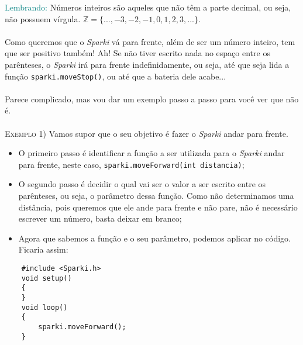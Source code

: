     \begin{center}
    \textcolor{teal}{Lembrando:} Números inteiros são aqueles que não têm a parte decimal, ou seja, não possuem vírgula. $\mathbb{Z}=\{..., -3, -2, -1, 0, 1, 2, 3, ...\}$.
    \end{center}
    
    \paragraph{}
    Como queremos que o \textsl{Sparki} vá para frente, além de ser um número inteiro, tem que ser positivo também! Ah! Se não tiver escrito nada no espaço entre os parênteses, o \textsl{Sparki} irá para frente indefinidamente, ou seja, até que seja lida a função \texttt{sparki.moveStop()}, ou até que a bateria dele acabe...
    \paragraph{}
    Parece complicado, mas vou dar um exemplo passo a passo para você ver que não é.
    \\~\\
    \textsc{Exemplo 1)} Vamos supor que o seu objetivo é fazer o \textsl{Sparki} andar para frente.
    
    \begin{itemize}
        \item O primeiro passo é identificar a função a ser utilizada para o \textsl{Sparki} andar para frente, neste caso, \texttt{sparki.moveForward(int distancia)};
        \item O segundo passo é decidir o qual vai ser o valor a ser escrito entre os parênteses, ou seja, o parâmetro dessa função. Como não determinamos uma distância, pois queremos que ele ande para frente e não pare, não é necessário escrever um número, basta deixar em branco;
        \item Agora que sabemos a função e o seu parâmetro, podemos aplicar no código. Ficaria assim:
    \end{itemize}
    
    \begin{verbatim}
    #include <Sparki.h>
    void setup()
    {
    }
    void loop()
    {
        sparki.moveForward();
    }
    \end{verbatim}
    
